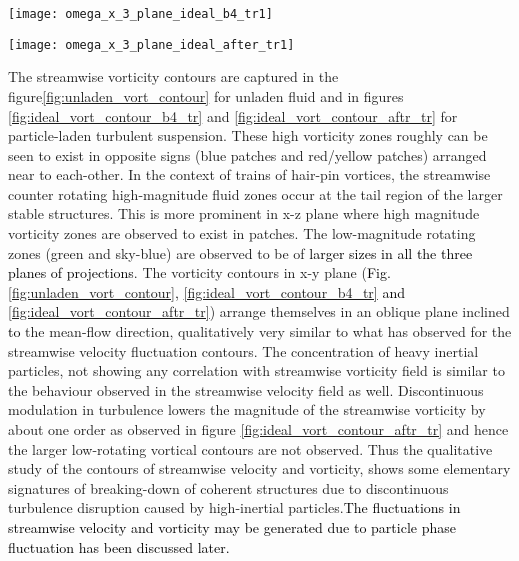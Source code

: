 \documentclass[aip,graphicx]{revtex4-1}
\begin{document}
\begin{figure*}[!h]
\centering
\texttt{[image: omega\_x\_3\_plane\_ideal\_b4\_tr1]}
	\caption{Contours of streamwise vorticity fluctuations of fluid phase laden with particles of Volume Fraction $\phi_{cr}=7.875X10^{-4}$ showed in three different planes as shown in the figures} 
	\label{fig:ideal_vort_contour_b4_tr}
\end{figure*}
\begin{figure*}[!h]
\centering
\texttt{[image: omega\_x\_3\_plane\_ideal\_after\_tr1]}
	\caption{Contours of streamwise vorticity fluctuations of fluid phase laden with particles of Volume Fraction $\phi=8.3125X10^{-4}$ showed in three different planes as shown in the figures} 
	\label{fig:ideal_vort_contour_aftr_tr}
\end{figure*}
The streamwise vorticity contours are captured in the figure\ref{fig:unladen_vort_contour} for unladen fluid and in figures \ref{fig:ideal_vort_contour_b4_tr} and \ref{fig:ideal_vort_contour_aftr_tr} for particle-laden turbulent suspension. 
These high vorticity zones roughly can be seen to exist in opposite signs (blue patches and red/yellow patches) arranged near to each-other. In the context of trains of hair-pin vortices, the streamwise counter rotating high-magnitude fluid zones occur at the tail region of the larger stable structures. This is more prominent in x-z plane where high magnitude vorticity zones are observed to exist in patches. The low-magnitude rotating zones (green and sky-blue) are observed to be of \textcolor{black}{larger sizes in all the three planes of projections}. The vorticity contours in x-y plane (\textcolor{black}{Fig. \ref{fig:unladen_vort_contour}, \ref{fig:ideal_vort_contour_b4_tr} and \ref{fig:ideal_vort_contour_aftr_tr}}) arrange themselves in an oblique plane inclined \textcolor{black}{to} the mean-flow direction, qualitatively very similar to what has observed for the streamwise velocity fluctuation contours. The concentration of heavy inertial particles, not showing any correlation with streamwise vorticity field is similar to the behaviour observed in the streamwise velocity field as well. Discontinuous modulation in turbulence lowers the magnitude of the streamwise vorticity by about one order as observed in figure \ref{fig:ideal_vort_contour_aftr_tr} and hence the larger low-rotating vortical contours are not observed. Thus the qualitative study of the contours of streamwise velocity and vorticity, shows some elementary signatures of breaking-down of coherent structures due to discontinuous turbulence disruption caused by high-inertial particles.\textcolor{black}{The fluctuations in streamwise velocity and vorticity may be generated due to particle phase fluctuation has been discussed later.} 
\end{document}
